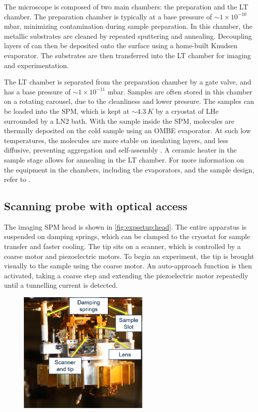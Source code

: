 The microscope is composed of two main chambers: the preparation and the \acf{LT} chamber. The preparation chamber is typically at a base pressure of $\sim 1\times 10^{-10}$ mbar, minimizing contamination during sample preparation. In this chamber, the metallic substrates are cleaned by repeated sputtering and annealing. Decoupling layers of  can then be deposited onto the surface using a home-built Knudsen evaporator. The substrates are then transferred into the \ac{LT} chamber for imaging and experimentation.

The \ac{LT} chamber is separated from the preparation chamber by a gate valve, and has a base pressure of $\sim 1\times 10^{-11}$ mbar. Samples are often stored in this chamber on a rotating carousel, due to the cleanliness and lower pressure. The samples can be loaded into the \ac{SPM}, which is kept at $\sim \SI{4.3}{K}$ by a cryostat of \acf{LHe} surrounded by a \acf{LN2} bath. With the sample inside the \ac{SPM}, molecules are thermally deposited on the cold sample using an \ac{OMBE} evaporator. At such low temperatures, the molecules are more stable on insulating  layers, and less diffusive, preventing aggregation and self-assembly . A ceramic heater in the sample stage allows for annealing in the \ac{LT} chamber. For more information on the equipment in the chambers, including the evaporators, and the sample design, refer to \citep{cochrane2017single, roussy2016coupling}. 



\subsection{Scanning probe with optical access}

The imaging \ac{SPM} head is shown in \autoref{fig:expsetup:head}. The entire apparatus is suspended on damping springs, which can be clamped to the cryostat for sample transfer and faster cooling. The tip sits on a scanner, which is controlled by a coarse motor and piezoelectric motors. To begin an experiment, the tip is brought visually  to the sample using the coarse motor. An auto-approach function is then activated, taking a coarse step and extending the piezoelectric motor repeatedly until a tunnelling current is detected.

\begin{figure} [h]
    \centering
    \includegraphics[width=2.5in]{pictures/head.png}
    \caption{}
    \label{fig:expsetup:head}
\end{figure}

